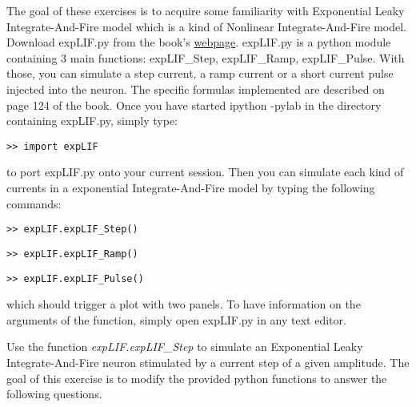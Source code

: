 \documentclass[a4paper,10pt]{Exercises}
\begin{document}
\newcommand{\erf}{\textrm{erf}}


The goal of these exercises is to acquire some familiarity with Exponential Leaky Integrate-And-Fire model which is a kind of Nonlinear Integrate-And-Fire model.
Download expLIF.py from the book's \href{http://neuronaldynamics.epfl.ch/lectures.html}{webpage}.  expLIF.py is a python module containing 3 main functions:  expLIF\_Step, expLIF\_Ramp, expLIF\_Pulse. With those, you can simulate a step current, a ramp current or a short current pulse injected into the neuron.  The specific formulas implemented are described on page 124 of the book.  Once you have started ipython -pylab in the directory containing expLIF.py, simply type:
\begin{verbatim}
>> import expLIF
\end{verbatim}
to port expLIF.py onto your current session.  Then you can simulate each kind of currents in a exponential Integrate-And-Fire model by typing the following commands:
\begin{verbatim}
>> expLIF.expLIF_Step()
\end{verbatim}
\begin{verbatim}
>> expLIF.expLIF_Ramp()
\end{verbatim}
\begin{verbatim}
>> expLIF.expLIF_Pulse()
\end{verbatim}
which should trigger a plot with two panels.  To have information on the arguments of the function, simply open expLIF.py in any text editor.

\Exercise[]

Use the function \emph{expLIF.expLIF\_Step} to simulate an Exponential Leaky Integrate-And-Fire neuron stimulated by a current step of a given amplitude. The goal of this exercise is to modify the provided python functions to answer the following questions.
\end{document}
